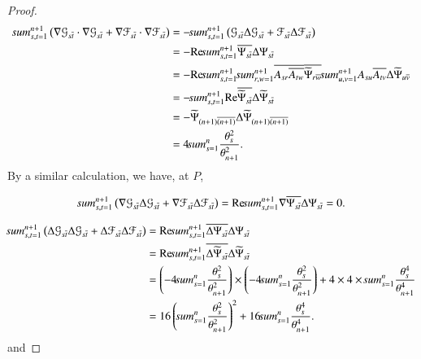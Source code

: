 \documentclass[12pt]{article}
\numberwithin{equation}{section}
\begin{document}
\begin{proof}
\begin{equation}\begin{aligned}\label{sys-1}\sum^{n+1}_{s,t=1}\left(\nabla \mathcal{G}_{s\overline{t}}\cdot
\nabla \mathcal{G}_{s\overline{t}}+\nabla \mathcal{F}_{s\overline{t}}\cdot\nabla \mathcal{F}_{s\overline{t}}\right)&=
-\sum^{n+1}_{s,t=1}\left(\mathcal{G}_{s\overline{t}}\Delta \mathcal{G}_{s\overline{t}}+\mathcal{F}_{s\overline{t}}\Delta \mathcal{F}_{s\overline{t}}\right)\\
&=-{\rm Re}\sum^{n+1}_{s,t=1}\overline{\Psi_{s\overline{t}}}\Delta \Psi_{s\overline{t}}\\&
=-{\rm Re}\sum^{n+1}_{s,t=1}\sum^{n+1}_{r,w=1}\overline{A_{sr}\overline{A_{tw}}}\overline{\widetilde{\Psi}_{r\overline{w}}}
\sum^{n+1}_{u,v=1}A_{su}\overline{A_{tv}}\Delta\widetilde{\Psi}_{u\overline{v}}\\
&=-\sum^{n+1}_{s,t=1}{\rm Re}\overline{\widetilde{\Psi}_{s\overline{t}}}\Delta \widetilde{\Psi}_{s\overline{t}}\\&
=-\widetilde{\Psi}_{(n+1)\overline{(n+1)}}\Delta\widetilde{\Psi}_{(n+1)\overline{(n+1)}}\\&=4\sum^{n}_{s=1}\frac{\theta_{s}^{2}}{\theta_{n+1}^{2}}.
\end{aligned}\end{equation}
By a similar calculation, we have, at $P$,


\begin{equation}\begin{aligned}\label{sys-2}\sum^{n+1}_{s,t=1}\left(\nabla \mathcal{G}_{s\overline{t}}
\Delta \mathcal{G}_{s\overline{t}}+\nabla \mathcal{F}_{s\overline{t}}\Delta \mathcal{F}_{s\overline{t}}\right)
={\rm Re}\sum^{n+1}_{s,t=1}\nabla\overline{\Psi_{s\overline{t}}}\Delta \Psi_{s\overline{t}}=0.
\end{aligned}\end{equation}



\begin{equation}\begin{aligned}\label{sys-3}\sum^{n+1}_{s,t=1}\left(\Delta \mathcal{G}_{s\overline{t}}
\Delta \mathcal{G}_{s\overline{t}}+\Delta \mathcal{F}_{s\overline{t}}\Delta \mathcal{F}_{s\overline{t}}\right)
&={\rm Re}\sum^{n+1}_{s,t=1}\overline{\Delta \Psi_{s\overline{t}}}\Delta \Psi_{s\overline{t}}\\
&={\rm Re}\sum^{n+1}_{s,t=1}\overline{\Delta \widetilde{\Psi}_{s\overline{t}}}\Delta \widetilde{\Psi}_{s\overline{t}}
\\&=\left(-4\sum^{n}_{s=1}\frac{\theta_{s}^{2}}{\theta_{n+1}^{2}}\right)\times\left(-4\sum^{n}_{s=1}\frac{\theta_{s}^{2}}{\theta_{n+1}^{2}}\right)
+4\times 4\times\sum^{n}_{s=1}\frac{\theta_{s}^{4}}{\theta_{n+1}^{4}}
\\&=16\left(\sum^{n}_{s=1}\frac{\theta_{s}^{2}}{\theta_{n+1}^{2}} \right)^{2}+16\sum^{n}_{s=1}\frac{\theta_{s}^{4}}{\theta_{n+1}^{4}}.
\end{aligned}\end{equation}and





\end{proof}
\end{document}

